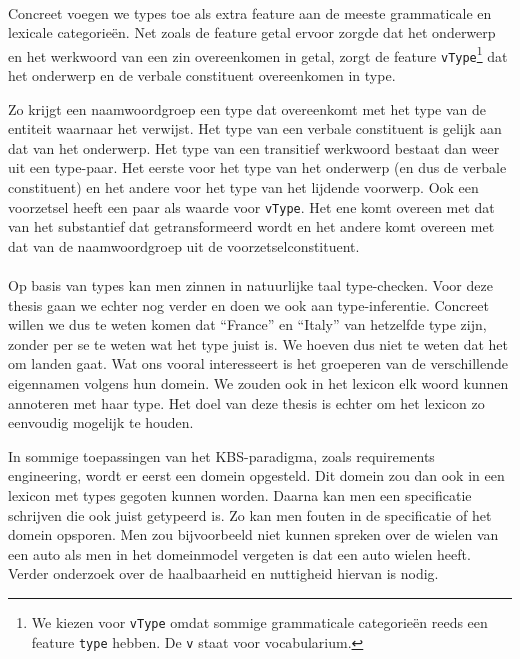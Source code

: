 \paragraph{} Concreet voegen we types toe als extra feature aan de meeste grammaticale en lexicale categorieën. Net zoals de feature getal ervoor zorgde dat het onderwerp en het werkwoord van een zin overeenkomen in getal, zorgt de feature \texttt{vType}\footnote{We kiezen voor \texttt{vType} omdat sommige grammaticale categorieën reeds een feature \texttt{type} hebben. De \texttt{v} staat voor vocabularium.} dat het onderwerp en de verbale constituent overeenkomen in type.

Zo krijgt een naamwoordgroep een type dat overeenkomt met het type van de entiteit waarnaar het verwijst. Het type van een verbale constituent is gelijk aan dat van het onderwerp. Het type van een transitief werkwoord bestaat dan weer uit een type-paar. Het eerste voor het type van het onderwerp (en dus de verbale constituent) en het andere voor het type van het lijdende voorwerp. Ook een voorzetsel heeft een paar als waarde voor \texttt{vType}. Het ene komt overeen met dat van het substantief dat getransformeerd wordt en het andere komt overeen met dat van de naamwoordgroep uit de voorzetselconstituent.

\paragraph{} Op basis van types kan men zinnen in natuurlijke taal type-checken. Voor deze thesis gaan we echter nog verder en doen we ook aan type-inferentie. Concreet willen we dus te weten komen dat ``France'' en ``Italy'' van hetzelfde type zijn, zonder per se te weten wat het type juist is. We hoeven dus niet te weten dat het om landen gaat. Wat ons vooral interesseert is het groeperen van de verschillende eigennamen volgens hun domein. We zouden ook in het lexicon elk woord kunnen annoteren met haar type. Het doel van deze thesis is echter om het lexicon zo eenvoudig mogelijk te houden. 

In sommige toepassingen van het KBS-paradigma, zoals requirements engineering, wordt er eerst een domein opgesteld. Dit domein zou dan ook in een lexicon met types gegoten kunnen worden. Daarna kan men een specificatie schrijven die ook juist getypeerd is. Zo kan men fouten in de specificatie of het domein opsporen. Men zou bijvoorbeeld niet kunnen spreken over de wielen van een auto als men in het domeinmodel vergeten is dat een auto wielen heeft. Verder onderzoek over de haalbaarheid en nuttigheid hiervan is nodig.

